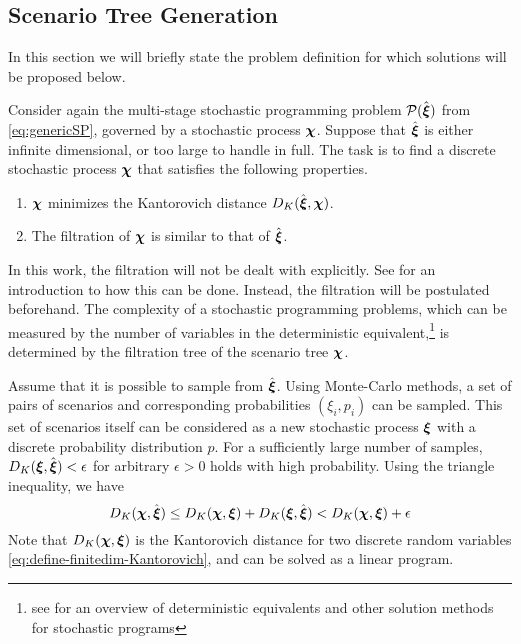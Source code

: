 \subsection{Scenario Tree Generation}
\label{sec:scen-tree-generation}
In this section we will briefly state the problem definition for which solutions will be proposed below.

Consider again the multi-stage stochastic programming problem $\mathcal{P}(\hat{\boldsymbol\xi})$ from \eqref{eq:genericSP}, governed by a stochastic process $\boldsymbol\chi$.
Suppose that $\hat{\boldsymbol\xi}$ is either infinite dimensional, or too large to handle in full.
The task is to find a discrete stochastic process $\boldsymbol\chi$ that satisfies the following properties.
\begin{enumerate}
\item $\boldsymbol\chi$ minimizes the Kantorovich distance $D_K(\hat{\boldsymbol\xi},\boldsymbol\chi)$.
\item The filtration of $\boldsymbol\chi$ is similar to that of $\hat{\boldsymbol\xi}$.
\end{enumerate}
In this work, the filtration will not be dealt with explicitly.
See  for an introduction to how this can be done.
Instead, the filtration will be postulated beforehand.
The complexity of a stochastic programming problems, which can be measured by the number of variables in the deterministic equivalent,\footnote{see  for an overview of deterministic equivalents and other solution methods for stochastic programs} is determined by the filtration tree of the scenario tree $\boldsymbol\chi$.

Assume that it is possible to sample from $\hat{\boldsymbol\xi}$.
Using Monte-Carlo methods, a set of pairs of scenarios and corresponding probabilities $(\xi_i,p_i)$ can be sampled.
This set of scenarios itself can be considered as a new stochastic process $\boldsymbol\xi$ with a discrete probability distribution $p$.
For a sufficiently large number of samples,  $D_K(\boldsymbol\xi,\hat{\boldsymbol\xi})<\epsilon$ for arbitrary $\epsilon>0$ holds with high probability.
Using the triangle inequality, we have
\begin{equation}
  \label{eq:triangle-montecarlo-kantoro}
  D_K(\boldsymbol\chi,\hat{\boldsymbol\xi}) \leq  D_K(\boldsymbol\chi, \boldsymbol\xi) + D_K(\boldsymbol\xi,\hat{\boldsymbol\xi})< D_K(\boldsymbol\chi,\boldsymbol\xi)+ \epsilon
\end{equation}
Note that $D_K(\boldsymbol\chi,\boldsymbol\xi)$ is the Kantorovich distance for two discrete random variables \eqref{eq:define-finitedim-Kantorovich}, and can be solved as a linear program.

